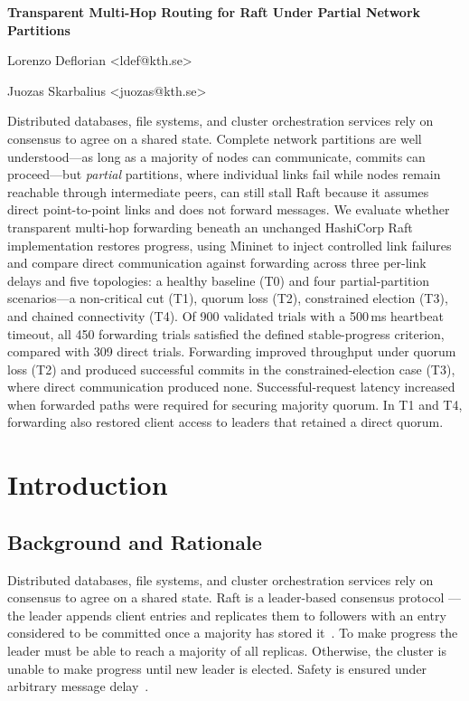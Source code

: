 \documentclass[11pt,a4paper]{article}
\newcommand{\unnumberedheading}[1]{%
  \par\vspace{2pt}{\fontsize{14}{16.5}\selectfont\bfseries #1\par}\vspace{6pt}%
}
\newcommand{\reporttitle}[1]{%
  {\fontsize{16}{19}\selectfont\bfseries #1\par}\vspace{12pt}%
}
\begin{document}
\reporttitle{Transparent Multi-Hop Routing for Raft Under Partial Network Partitions}
\unnumberedheading{Authors}
Lorenzo Deflorian <ldef@kth.se>\par
Juozas Skarbalius <juozas@kth.se>\par
\vspace{2pt}

\unnumberedheading{Abstract}
Distributed databases, file systems, and cluster orchestration services rely on consensus to agree on a shared state.
Complete network partitions are well understood---as long as a majority of nodes can communicate, commits can proceed---but \emph{partial} partitions, where individual links fail while nodes remain reachable through intermediate peers, can still stall Raft because it assumes direct point-to-point links and does not forward messages.
We evaluate whether transparent multi-hop forwarding beneath an unchanged HashiCorp Raft implementation restores progress, using Mininet to inject controlled link failures and compare direct communication against forwarding across three per-link delays and five topologies: a healthy baseline (T0) and four partial-partition scenarios---a non-critical cut (T1), quorum loss (T2), constrained election (T3), and chained connectivity (T4).
Of 900 validated trials with a 500\,ms heartbeat timeout, all 450 forwarding trials satisfied the defined stable-progress criterion, compared with 309 direct trials.
Forwarding improved throughput under quorum loss (T2) and produced successful commits in the constrained-election case (T3), where direct communication produced none.
Successful-request latency increased when forwarded paths were required for securing majority quorum.
In T1 and T4, forwarding also restored client access to leaders that retained a direct quorum.

\newpage

\section{Introduction}

\subsection{Background and Rationale}

Distributed databases, file systems, and cluster orchestration services rely on consensus to agree on a shared state.
Raft is a leader-based consensus protocol --- the leader appends client entries and replicates them to followers with an entry considered to be committed once a majority has stored it~\cite[Sec.~5.3]{ongaro2014raft}.
To make progress the leader must be able to reach a majority of all replicas.
Otherwise, the cluster is unable to make progress until new leader is elected.
Safety is ensured under arbitrary message delay~\cite[Secs.~5.3--5.4]{ongaro2014raft}.
\end{document}
